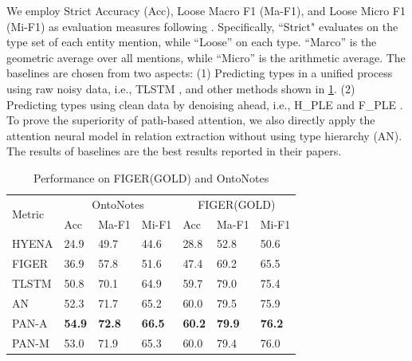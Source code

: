 \documentclass[letterpaper]{article} %
\begin{document}
We employ Strict Accuracy (Acc), Loose Macro F1 (Ma-F1), and Loose Micro F1 (Mi-F1) as evaluation measures following \cite{Shimaoka2016Neural}. Specifically, ``Strict" evaluates on the type set of each entity mention, while ``Loose'' on each type. ``Marco'' is the geometric average over all mentions, while ``Micro'' is the arithmetic average. %
The baselines are chosen from two aspects: (1) Predicting types in a unified process using raw noisy data, i.e., TLSTM \cite{Shimaoka2016Neural}, and other methods shown in \tablename \ref{performance}.
(2) Predicting types using clean data by denoising ahead, i.e., H\_PLE and F\_PLE \cite{Ren2016Label}. To prove the superiority of path-based attention, we also directly apply the attention neural model in relation extraction \cite{Lin2016Neural} without using type hierarchy (AN). %
The results of baselines are the best results reported in their papers. %
\begin{table}[htbp]
\small
\centering
\caption{Performance on FIGER(GOLD) and OntoNotes}
\label{performance}
 \begin{tabular}{p{1cm}|p{0.61cm}p{0.87cm}p{0.87cm}|p{0.60cm}p{0.87cm}p{0.87cm}}
\hline
\multirow{2}{*}{Metric} & \multicolumn{3}{c|}{OntoNotes} & \multicolumn{3}{c}{FIGER(GOLD)} \\
  & Acc &  Ma-F1 & Mi-F1 & Acc & Ma-F1 & Mi-F1 \\
\hline
HYENA & 24.9 & 49.7 & 44.6 & 28.8 & 52.8 & 50.6 \\
FIGER & 36.9 & 57.8 & 51.6 &  47.4 & 69.2 & 65.5  \\
TLSTM & 50.8 & 70.1 & 64.9 &  59.7 & 79.0 & 75.4  \\
\hline
AN & 52.3 & 71.7 & 65.2 & 60.0 & 79.5 & 75.9  \\
PAN-A & \textbf{54.9} & \textbf{72.8} & \textbf{66.5} & \textbf{60.2} & \textbf{79.9} & \textbf{76.2}  \\
PAN-M &  53.0 & 71.9 &65.3 & 60.0 & 79.4 &  76.0 \\
\hline
\end{tabular}
\end{table}
\end{document}
